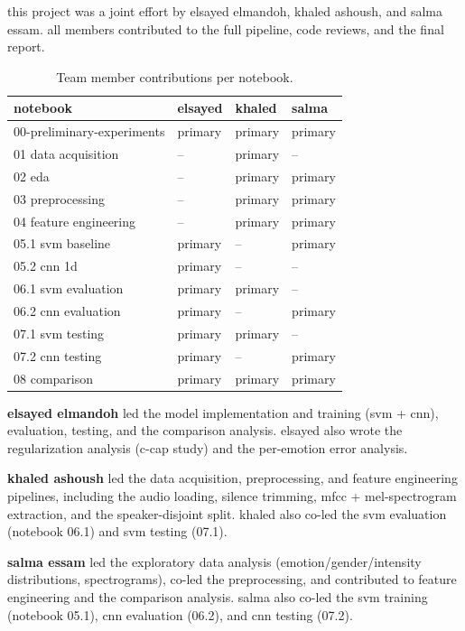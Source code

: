 \documentclass[conference]{IEEEtran}
\begin{document}
{this project was a joint effort by elsayed elmandoh, khaled ashoush, and
salma essam. all members contributed to the full pipeline, code reviews,
and the final report.

\begin{table}[t]
\centering
\caption{Team member contributions per notebook.}
\label{tab:team-contributions}
\begin{tabular}{@{}llll@{}}

\toprule
notebook & elsayed & khaled & salma \\
\midrule
00-preliminary-experiments & primary & primary & primary \\
01 data acquisition & -- & primary & -- \\
02 eda & -- & primary & primary \\
03 preprocessing & -- & primary & primary \\
04 feature engineering & -- & primary & primary \\
05.1 svm baseline & primary & -- & primary \\
05.2 cnn 1d & primary & -- & -- \\
06.1 svm evaluation & primary & primary & -- \\
06.2 cnn evaluation & primary & -- & primary \\
07.1 svm testing & primary & primary & -- \\
07.2 cnn testing & primary & -- & primary \\
08 comparison & primary & primary & primary \\
\bottomrule
\end{tabular}
\end{table}

\textbf{elsayed elmandoh} led the model implementation and training (svm
+ cnn), evaluation, testing, and the comparison analysis. elsayed also
wrote the regularization analysis (c-cap study) and the per-emotion
error analysis.

\textbf{khaled ashoush} led the data acquisition, preprocessing, and
feature engineering pipelines, including the audio loading, silence
trimming, mfcc + mel-spectrogram extraction, and the speaker-disjoint
split. khaled also co-led the svm evaluation (notebook 06.1) and svm
testing (07.1).

\textbf{salma essam} led the exploratory data analysis
(emotion/gender/intensity distributions, spectrograms), co-led the
preprocessing, and contributed to feature engineering and the comparison
analysis. salma also co-led the svm training (notebook 05.1), cnn
evaluation (06.2), and cnn testing (07.2).

}
\end{document}
